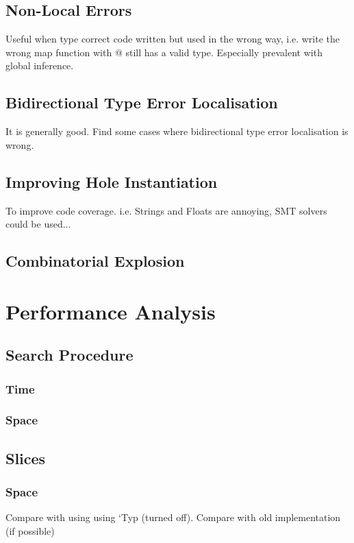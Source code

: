 \subsection{Non-Local Errors}
Useful when type correct code written but used in the wrong way, i.e. write the wrong map function with @ still has a valid type. Especially prevalent with global inference.
\subsection{Bidirectional Type Error Localisation}
It is generally good. Find some cases where bidirectional type error localisation is wrong.
\subsection{Improving Hole Instantiation}
To improve code coverage. i.e. Strings and Floats are annoying, SMT solvers could be used...
\subsection{Combinatorial Explosion}


\section{Performance Analysis}
\subsection{Search Procedure}
\subsubsection{Time}
\subsubsection{Space}

\subsection{Slices}
\subsubsection{Space}
Compare with using using `Typ (turned off). Compare with old implementation (if possible)